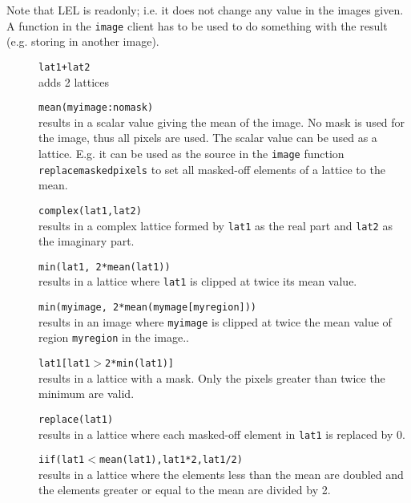 Note that LEL is readonly; i.e. it does not change any value in
the images given. A function in the \texttt{image} client has to
be used to do something with the result (e.g. storing in another image).
\begin{description}
  \item[] \texttt{lat1+lat2}
    \\adds 2 lattices
  \item[] \texttt{mean(myimage:nomask)}
    \\results in a scalar value giving the mean of the image.
    No mask is used for the image, thus all pixels are used.
    The scalar value can be used as a lattice. E.g. it can be used as
    the source in the \texttt{image} function
    \texttt{replacemaskedpixels} to set all masked-off elements of a
    lattice to the mean.
  \item[] \texttt{complex(lat1,lat2)}
    \\results in a complex lattice formed by \texttt{lat1} as the
    real part and \texttt{lat2} as the imaginary part.
  \item[] \texttt{min(lat1, 2*mean(lat1))}
    \\results in a lattice where \texttt{lat1} is clipped at twice
    its mean value.
  \item[] \texttt{min(myimage, 2*mean(mymage[myregion]))}
    \\results in an image where \texttt{myimage} is clipped at twice
    the mean value of region \texttt{myregion} in the image..
  \item[] \texttt{lat1[lat1$>$2*min(lat1)]}
    \\results in a lattice with a mask. Only the pixels
    greater than twice the minimum are valid.
  \item[] \texttt{replace(lat1)}
    \\results in a lattice where each masked-off element in
    \texttt{lat1} is replaced by 0.
  \item[] \texttt{iif(lat1$<$mean(lat1),lat1*2,lat1/2)}
    \\results in a lattice where the elements less than the mean
    are doubled and the elements greater or equal to the mean are
    divided by 2.
\end{description}

